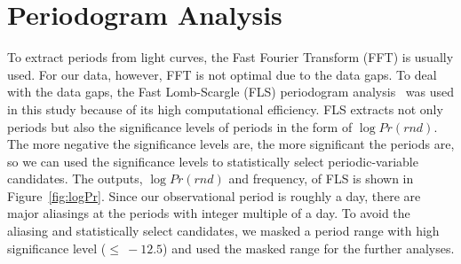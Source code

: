 \documentclass[aps,prb,twocolumn,superscriptaddress]{revtex4-1}
\begin{document}
\section{Periodogram Analysis}\label{sec:PA}

To extract periods from light curves, the Fast Fourier Transform (FFT) is usually used. For our data, however, FFT is not optimal due to the data gaps. To deal with the data gaps, the Fast Lomb-Scargle (FLS) periodogram analysis~\citep{Numerical, Gats} was used in this study because of its high computational efficiency. FLS extracts not only periods but also the significance levels of periods in the form of $\log{Pr(rnd)}$. The more negative the significance levels are, the more significant the periods are, so we can used the significance levels to statistically select periodic-variable candidates. The outputs, $\log{Pr(rnd)}$ and frequency, of FLS is shown in Figure~\ref{fig:logPr}. Since our observational period is roughly a day, there are major aliasings at the periods with integer multiple of a day. To avoid the aliasing and statistically select candidates, we masked a period range with high significance level ($\leq~-12.5$) and used the masked range for the further analyses.
\end{document}
